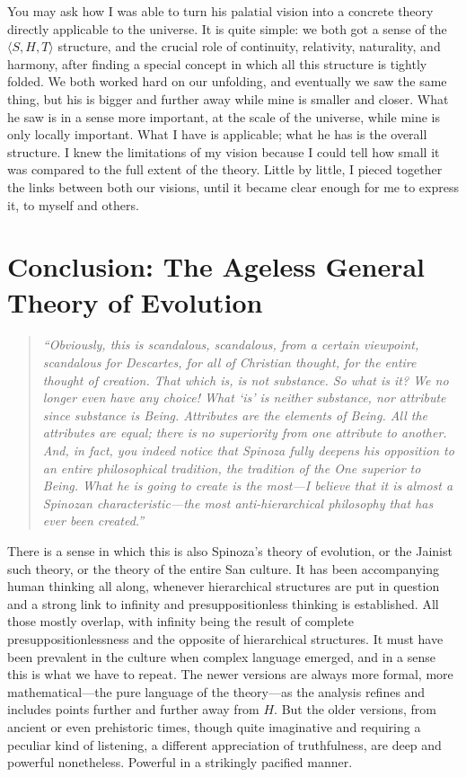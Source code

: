 \documentclass[11pt]{article}
\newcommand{\quoteattr}[2]{%
  \par\smallskip{\normalfont\hfill--- #1\par\hfill\emph{#2}}%
}
\newenvironment{epigraphquote}
  {\begin{quote}\small\itshape}
  {\end{quote}}
\begin{document}
You may ask how I was able to turn his palatial vision into a concrete theory
directly applicable to the universe. It is quite simple: we both got a sense of
the \(\langle S,H,T\rangle\) structure, and the crucial role of continuity,
relativity, naturality, and harmony, after finding a special concept in which
all this structure is tightly folded. We both worked hard on our unfolding, and
eventually we saw the same thing, but his is bigger and further away while mine
is smaller and closer. What he saw is in a sense more important, at the scale
of the universe, while mine is only locally important. What I have is
applicable; what he has is the overall structure. I knew the limitations of my
vision because I could tell how small it was compared to the full extent of the
theory. Little by little, I pieced together the links between both our visions,
until it became clear enough for me to express it, to myself and others.

\section*{Conclusion: The Ageless General Theory of Evolution}

\begin{epigraphquote}
``Obviously, this is scandalous, scandalous, from a certain viewpoint,
scandalous for Descartes, for all of Christian thought, for the entire thought
of creation. That which is, is not substance. So what is it? We no longer even
have any choice! What `is' is neither substance, nor attribute since substance
is Being. Attributes are the elements of Being. All the attributes are equal;
there is no superiority from one attribute to another. And, in fact, you indeed
notice that Spinoza fully deepens his opposition to an entire philosophical
tradition, the tradition of the One superior to Being. What he is going to
create is the most---I believe that it is almost a Spinozan characteristic---the
most anti-hierarchical philosophy that has ever been created.''
\quoteattr{Gilles Deleuze}{Seminar of December 2, 1980}
\end{epigraphquote}

There is a sense in which this is also Spinoza's theory of evolution, or the
Jainist such theory, or the theory of the entire San culture. It has been
accompanying human thinking all along, whenever hierarchical structures are put
in question and a strong link to infinity and presuppositionless thinking is
established. All those mostly overlap, with infinity being the result of
complete presuppositionlessness and the opposite of hierarchical structures. It
must have been prevalent in the culture when complex language emerged, and in a
sense this is what we have to repeat. The newer versions are always more
formal, more mathematical---the pure language of the theory---as the analysis
refines and includes points further and further away from \(H\). But the older
versions, from ancient or even prehistoric times, though quite imaginative and
requiring a peculiar kind of listening, a different appreciation of
truthfulness, are deep and powerful nonetheless. Powerful in a strikingly
pacified manner.
\end{document}
